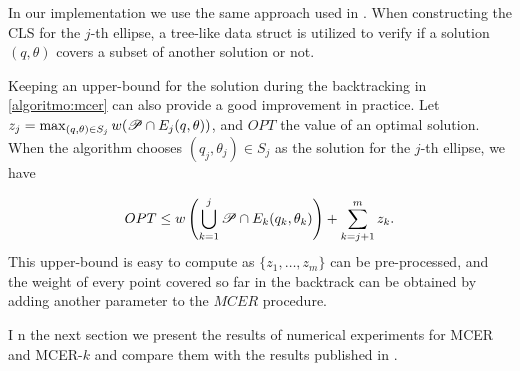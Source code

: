 In our implementation we use the same approach used in . When constructing the CLS for the $j$-th ellipse, a tree-like data struct is utilized to verify if a solution $(q, \theta)$ covers a subset of another solution or not.

Keeping an upper-bound for the solution during the backtracking in \autoref{algoritmo:mcer} can also provide a good improvement in practice. Let $z_j = \max_{(q, \theta) \in S_j} w(\mathscr{P} \cap E_j(q, \theta))$, and $OPT$ the value of an optimal solution. When the algorithm chooses $(q_j, \theta_j) \in S_j$ as the solution for the $j$-th ellipse, we have

\begin{equation}
OPT \le w\left(\bigcup_{k=1}^{j} \mathscr{P} \cap E_k(q_k, \theta_k)\right) + \sum_{k=j+1}^m z_k.
\end{equation}
This upper-bound is easy to compute as $\{z_1, \dots, z_m\}$ can be pre-processed, and the weight of every point covered so far in the backtrack can be obtained by adding another parameter to the $MCER$ procedure.

I n the next section we present the results of numerical experiments for MCER and MCER-$k$ and compare them with the results published in .